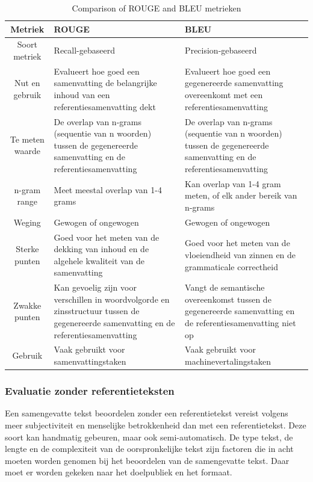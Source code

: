 \begin{table}[!h]
	\centering
	\begin{tabular}{|c|p{5cm}|p{5cm}|}
		\hline
		Metriek & ROUGE & BLEU \\
		\hline
		Soort metriek & Recall-gebaseerd & Precision-gebaseerd \\
		\hline
		Nut en gebruik & Evalueert hoe goed een samenvatting de belangrijke inhoud van een referentiesamenvatting dekt & Evalueert hoe goed een gegenereerde samenvatting overeenkomt met een referentiesamenvatting \\
		\hline
		Te meten waarde & De overlap van n-grams (sequentie van n woorden) tussen de gegenereerde samenvatting en de referentiesamenvatting & De overlap van n-grams (sequentie van n woorden) tussen de gegenereerde samenvatting en de referentiesamenvatting \\
		\hline
		n-gram range & Meet meestal overlap van 1-4 grams & Kan overlap van 1-4 gram meten, of elk ander bereik van n-grams \\
		\hline
		Weging & Gewogen of ongewogen & Gewogen of ongewogen \\
		\hline
		Sterke punten & Goed voor het meten van de dekking van inhoud en de algehele kwaliteit van de samenvatting & Goed voor het meten van de vloeiendheid van zinnen en de grammaticale correctheid \\
		\hline
		Zwakke punten & Kan gevoelig zijn voor verschillen in woordvolgorde en zinsstructuur tussen de gegenereerde samenvatting en de referentiesamenvatting & Vangt de semantische overeenkomst tussen de gegenereerde samenvatting en de referentiesamenvatting niet op \\
		\hline
		Gebruik & Vaak gebruikt voor samenvattingstaken & Vaak gebruikt voor machinevertalingstaken \\
		\hline
	\end{tabular}
	\caption{Comparison of ROUGE and BLEU metrieken}
	\label{tab:rouge_bleu_comparison}
\end{table}


\subsubsection{Evaluatie zonder referentieteksten}

Een samengevatte tekst beoordelen zonder een referentietekst vereist volgens \textcite{Steinberger2009} meer subjectiviteit en menselijke betrokkenheid dan met een referentietekst. Deze soort kan handmatig gebeuren, maar ook semi-automatisch. De type tekst, de lengte en de complexiteit van de oorspronkelijke tekst zijn factoren die in acht moeten worden genomen bij het beoordelen van de samengevatte tekst. Daar moet er worden gekeken naar het doelpubliek en het formaat.

